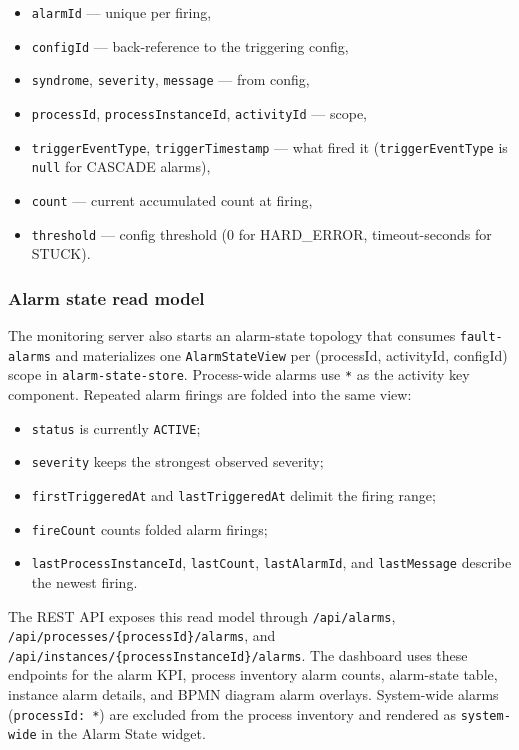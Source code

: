 \begin{itemize}
\item \texttt{alarmId} --- unique per firing,
\item \texttt{configId} --- back-reference to the triggering config,
\item \texttt{syndrome}, \texttt{severity}, \texttt{message} --- from config,
\item \texttt{processId}, \texttt{processInstanceId}, \texttt{activityId} --- scope,
\item \texttt{triggerEventType}, \texttt{triggerTimestamp} --- what fired it
  (\texttt{triggerEventType} is \texttt{null} for CASCADE alarms),
\item \texttt{count} --- current accumulated count at firing,
\item \texttt{threshold} --- config threshold (0 for HARD\_ERROR, timeout-seconds for STUCK).
\end{itemize}

\subsubsection{Alarm state read model}

The monitoring server also starts an alarm-state topology that consumes
\texttt{fault-alarms} and materializes one \texttt{AlarmStateView} per
(processId, activityId, configId) scope in \texttt{alarm-state-store}. Process-wide
alarms use \texttt{*} as the activity key component. Repeated alarm firings are
folded into the same view:

\begin{itemize}
\item \texttt{status} is currently \texttt{ACTIVE};
\item \texttt{severity} keeps the strongest observed severity;
\item \texttt{firstTriggeredAt} and \texttt{lastTriggeredAt} delimit the firing range;
\item \texttt{fireCount} counts folded alarm firings;
\item \texttt{lastProcessInstanceId}, \texttt{lastCount}, \texttt{lastAlarmId}, and
      \texttt{lastMessage} describe the newest firing.
\end{itemize}

The REST API exposes this read model through \texttt{/api/alarms},
\texttt{/api/processes/\{processId\}/alarms}, and
\texttt{/api/instances/\{processInstanceId\}/alarms}. The dashboard uses these
endpoints for the alarm KPI, process inventory alarm counts, alarm-state table,
instance alarm details, and BPMN diagram alarm overlays.
System-wide alarms (\texttt{processId:\,*}) are excluded from the process
inventory and rendered as \texttt{system-wide} in the Alarm State widget.

